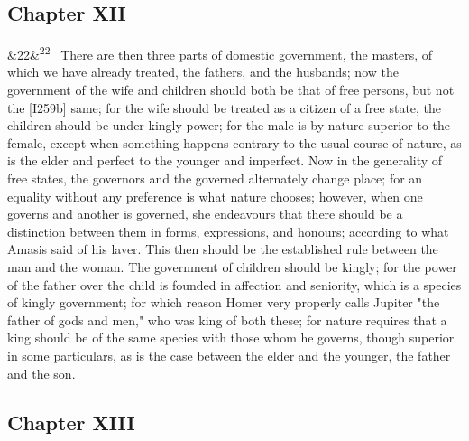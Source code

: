 \documentclass[12pt]{article}
\newcommand{\para}[1][]{\par\noindent\ifx&#1&\else\textsuperscript{\footnotesize #1}~\fi}
\begin{document}
\subsection*{Chapter XII}

\para[22] There are then three parts of domestic government, the masters, of which we have already treated, the fathers, and the husbands; now the government of the wife and children should both be that of free persons, but not the [I259b] same; for the wife should be treated as a citizen of a free state, the children should be under kingly power; for the male is by nature superior to the female, except when something happens contrary to the usual course of nature, as is the elder and perfect to the younger and imperfect. Now in the generality of free states, the governors and the governed alternately change place; for an equality without any preference is what nature chooses; however, when one governs and another is governed, she endeavours that there should be a distinction between them in forms, expressions, and honours; according to what Amasis said of his laver. This then should be the established rule between the man and the woman. The government of children should be kingly; for the power of the father over the child is founded in affection and seniority, which is a species of kingly government; for which reason Homer very properly calls Jupiter "the father of gods and men," who was king of both these; for nature requires that a king should be of the same species with those whom he governs, though superior in some particulars, as is the case between the elder and the younger, the father and the son.

\subsection*{Chapter XIII}
\end{document}

